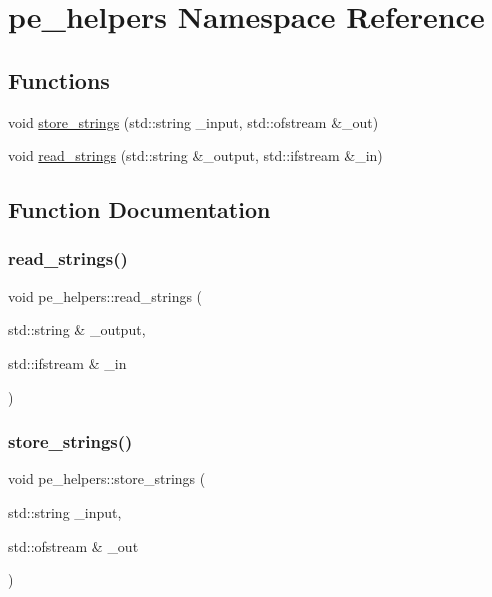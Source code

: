 \hypertarget{namespacepe__helpers}{}\section{pe\+\_\+helpers Namespace Reference}
\label{namespacepe__helpers}
\subsection*{Functions}
\begin{DoxyCompactItemize}
\item 
void \mbox{\hyperlink{namespacepe__helpers_a748d3a0f149b3af706de41ad8ff6d3cb}{store\+\_\+strings}} (std\+::string \+\_\+input, std\+::ofstream \&\+\_\+out)
\item 
void \mbox{\hyperlink{namespacepe__helpers_acbe3086d8392d86652c50df1ca1f31a8}{read\+\_\+strings}} (std\+::string \&\+\_\+output, std\+::ifstream \&\+\_\+in)
\end{DoxyCompactItemize}


\subsection{Function Documentation}
\mbox{\label{namespacepe__helpers_acbe3086d8392d86652c50df1ca1f31a8}} 
\subsubsection{\texorpdfstring{read\+\_\+strings()}{read\_strings()}}
{\footnotesize\ttfamily void pe\+\_\+helpers\+::read\+\_\+strings (\begin{DoxyParamCaption}\item[{std\+::string \&}]{\+\_\+output,  }\item[{std\+::ifstream \&}]{\+\_\+in }\end{DoxyParamCaption})}

\mbox{\label{namespacepe__helpers_a748d3a0f149b3af706de41ad8ff6d3cb}} 
\subsubsection{\texorpdfstring{store\+\_\+strings()}{store\_strings()}}
{\footnotesize\ttfamily void pe\+\_\+helpers\+::store\+\_\+strings (\begin{DoxyParamCaption}\item[{std\+::string}]{\+\_\+input,  }\item[{std\+::ofstream \&}]{\+\_\+out }\end{DoxyParamCaption})}

